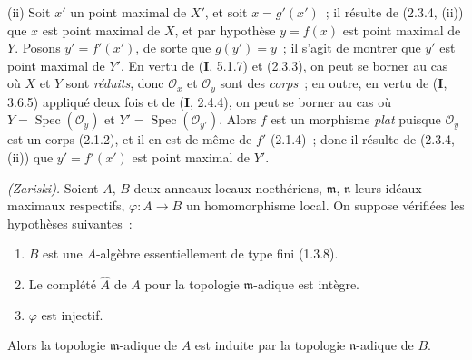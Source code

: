 (ii) Soit $x'$ un point maximal de $X'$, et soit $x=g'(x')$~; il résulte de
(2.3.4, (ii)) que $x$ est point maximal de $X$, et par hypothèse $y=f(x)$ est
point maximal de $Y$. Posons $y'=f'(x')$, de sorte que $g(y')=y$~; il s'agit
de montrer que $y'$ est point maximal de $Y'$. En vertu de (\textbf{I}, 5.1.7) et
(2.3.3), on peut se borner au cas où $X$ et $Y$ sont \emph{réduits}, donc
$\mathcal O_x$ et $\mathcal O_y$ sont des \emph{corps}~; en outre, en vertu de
(\textbf{I}, 3.6.5) appliqué deux fois et de (\textbf{I}, 2.4.4), on peut se borner au cas où
$Y=\operatorname{Spec}(\mathcal O_y)$ et
$Y'=\operatorname{Spec}(\mathcal O_{y'})$. Alors $f$ est un morphisme
\emph{plat} puisque $\mathcal O_y$ est un corps (2.1.2), et il en est de même
de $f'$ (2.1.4)~; donc il résulte de (2.3.4, (ii)) que $y'=f'(x')$ est point
maximal de $Y'$.

\begin{corollary}[2.3.8]
\label{IV.2.3.8-fr}
\emph{(Zariski).} Soient $A$, $B$ deux anneaux locaux noethériens,
$\mathfrak m$, $\mathfrak n$ leurs idéaux maximaux respectifs,
$\varphi:A\to B$ un homomorphisme local. On suppose vérifiées les hypothèses
suivantes~:
\begin{enumerate}
  \item[$1^\circ$] $B$ est une $A$-algèbre essentiellement de type fini
  \textup{(1.3.8)}.
  \item[$2^\circ$] Le complété $\widehat A$ de $A$ pour la topologie
  $\mathfrak m$-adique est intègre.
  \item[$3^\circ$] $\varphi$ est injectif.
\end{enumerate}
Alors la topologie $\mathfrak m$-adique de $A$ est induite par la topologie
$\mathfrak n$-adique de $B$.
\end{corollary}

